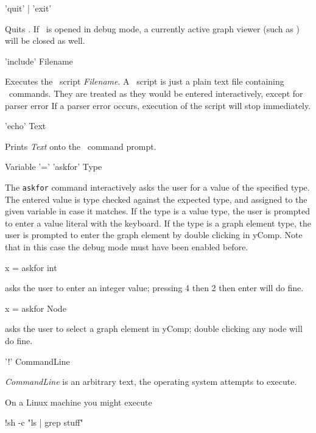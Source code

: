 \begin{rail}
  'quit' | 'exit'
\end{rail}
Quits \GrShell. If \GrShell\ is opened in debug mode, a currently active graph viewer (such as \yComp) will be closed as well.

\begin{rail}
  'include' Filename
\end{rail}
Executes the \GrShell\ script \emph{Filename}.
A \GrShell\ script is just a plain text file containing \GrShell\ commands.
They are treated as they would be entered interactively, except for parser error
If a parser error occurs, execution of the script will stop immediately.

\begin{rail}
  'echo' Text
\end{rail}
Prints \emph{Text} onto the \GrShell\ command prompt.

\begin{rail}
  Variable '=' 'askfor' Type
\end{rail}
The \texttt{askfor} command interactively asks the user for a value of the specified type.
The entered value is type checked against the expected type, and assigned to the given variable in case it matches.
If the type is a value type, the user is prompted to enter a value literal with the keyboard.
If the type is a graph element type, the user is prompted to enter the graph element by double clicking in yComp.
Note that in this case the debug mode must have been enabled before.

\begin{example}
\begin{grshelllet}
x = askfor int
\end{grshelllet}
asks the user to enter an integer value; pressing 4 then 2 then enter will do fine.
\begin{grshelllet}
x = askfor Node
\end{grshelllet}
asks the user to select a graph element in yComp; double clicking any node will do fine. 
\end{example}

\begin{rail}
  '!' CommandLine
\end{rail}
\emph{CommandLine} is an arbitrary text, the operating system attempts to execute.
\begin{example}
On a Linux machine you might execute
\begin{grshell}
!sh -c "ls | grep stuff"
\end{grshell}
\end{example}

